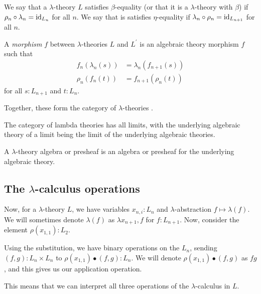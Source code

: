\begin{definition}
  We say that a $ \lambda $-theory $ L $ satisfies $ \beta $-equality (or that it is a $ \lambda $-theory with $ \beta $) if $ \rho_n \circ \lambda_n = \text{id}_{L_n} $ for all $ n $. We say that is satisfies $ \eta $-equality if $ \lambda_n \circ \rho_n = \text{id}_{L_{n + 1}} $ for all $ n $.
\end{definition}

\begin{definition}
  A \textit{morphism} $ f $ between $ \lambda $-theories $ L $ and $ L^\prime $ is an algebraic theory morphism $ f $ such that
  \begin{align*}
    f_n(\lambda_n(s)) &= \lambda_n(f_{n + 1}(s))\\
    \rho_n(f_n(t)) &= f_{n + 1}(\rho_n(t))
  \end{align*}
  for all $ s: L_{n + 1} $ and $ t: L_n $.
\end{definition}

Together, these form the category of $ \lambda $-theories \iindex{$ \LamTh $}.

\begin{remark}
  The category of lambda theories has all limits, with the underlying algebraic theory of a limit being the limit of the underlying algebraic theories.
\end{remark}

\begin{definition}
  A $ \lambda $-theory algebra or presheaf is an algebra or presheaf for the underlying algebraic theory.
\end{definition}

\subsection{The $ \lambda $-calculus operations}\label{subsec:lambda-calculus-operations}
Now, for a $ \lambda $-theory $ L $, we have variables $ x_{n, i} : L_n $ and $ \lambda $-abstraction $ f \mapsto \lambda(f) $. We will sometimes denote $ \lambda(f) $ as $ \lambda x_{n + 1}, f $ for $ f: L_{n + 1} $. Now, consider the element $ \rho(x_{1, 1}) : L_2 $.
\begin{definition}
  Using the substitution, we have binary operations on the $ L_n $, sending $ (f, g) : L_n \times L_n $ to $ \rho(x_{1, 1}) \bullet (f, g) : L_n $. We will denote $ \rho(x_{1, 1}) \bullet (f, g) $ as $ f g $, and this gives us our application operation.
\end{definition}
This means that we can interpret all three operations of the $ \lambda $-calculus in $ L $.

